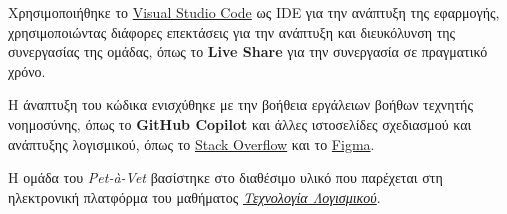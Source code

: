 \documentclass[12pt,a4paper,twoside]{book}
\begin{document}
Χρησιμοποιήθηκε το \href{https://code.visualstudio.com/}{Visual Studio Code} ως IDE για την ανάπτυξη της εφαρμογής, χρησιμοποιώντας διάφορες επεκτάσεις για την ανάπτυξη και διευκόλυνση της συνεργασίας της ομάδας, όπως το \textbf{Live Share} για την συνεργασία σε πραγματικό χρόνο. %

Η άναπτυξη του κώδικα ενισχύθηκε με την βοήθεια εργάλειων βοήθων τεχνητής νοημοσύνης, όπως το \textbf{GitHub Copilot} και άλλες ιστοσελίδες σχεδιασμού και ανάπτυξης λογισμικού, όπως το \href{https://stackoverflow.com/questions}{Stack Overflow} και το \href{https://www.figma.com/}{Figma}. %

Η ομάδα του \textit{Pet-à-Vet} βασίστηκε στο διαθέσιμο υλικό που παρέχεται στη ηλεκτρονική πλατφόρμα του μαθήματος \href{https://eclass.upatras.gr/courses/CEID1030/}{\textit{Τεχνολογία Λογισμικού}}. %
\end{document}
